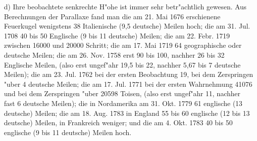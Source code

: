 \documentclass[a4paper, 11pt, oneside, polutonikogreek, german]{article}
\begin{document}
d) Ihre beobachtete senkrechte H"ohe ist immer sehr betr"achtlich gewesen. Aus Berechnungen der Parallaxe fand man die am 21. Mai 1676 erschienene Feuerkugel wenigstens 38 Italienische (9,5 deutsche) Meilen hoch; die am 31. Jul. 1708 40 bis 50 Englische (9 bis 11 deutsche) Meilen; die am 22. Febr. 1719 zwischen 16000 und 20000 Schritt; die am 17. Mai 1719 64 geographische oder deutsche Meilen; die am 26. Nov. 1758 erst 90 bis 100, nachher 26 bis 32 Englische Meilen, (also erst ungef"ahr 19,5 bis 22, nachher 5,67 bis 7 deutsche Meilen); die am 23. Jul. 1762 bei der ersten Beobachtung 19, bei dem Zerspringen "uber 4 deutsche Meilen; die am 17. Jul. 1771 bei der ersten Wahrnehmung 41076 und bei dem Zerspringen "uber 20598 Toisen, (also erst ungef"ahr 11, nachher fast 6 deutsche Meilen); die in Nordamerika am 31. Okt. 1779 61 englische (13 deutsche) Meilen; die am 18. Aug. 1783 in England 55 bis 60 englische (12 bis 13 deutsche) Meilen, in Frankreich weniger; und die am 4. Okt. 1783 40 bis 50 englische (9 bis 11 deutsche) Meilen hoch.
\end{document}
